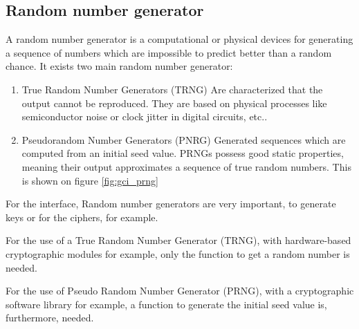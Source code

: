 \subsection{Random number generator}
\label{gci_rng}

A random number generator is a computational or physical devices for generating
a sequence of numbers which are impossible to predict better than a random
chance.\newline
It exists two main random number generator:
\begin{enumerate}
  \item True Random Number Generators (TRNG)\newline
  Are characterized that the output cannot be reproduced. They are based on
  physical processes like semiconductor noise or clock jitter in digital
  circuits, etc..
  \item Pseudorandom Number Generators (PNRG)
  Generated sequences which are computed from an initial seed value. PRNGs
  possess good static properties, meaning their output approximates a sequence
  of true random numbers. This is shown on figure \ref{fig:gci_prng}
\end{enumerate}

For the interface, Random number generators are very important, to generate keys
or for the ciphers, for example.

For the use of a True Random Number Generator (TRNG), with hardware-based
cryptographic modules for example, only the function to get a random number is
needed.

For the use of Pseudo Random Number Generator (PRNG), with a
cryptographic software library for example, a function to generate the initial
seed value is, furthermore, needed.


